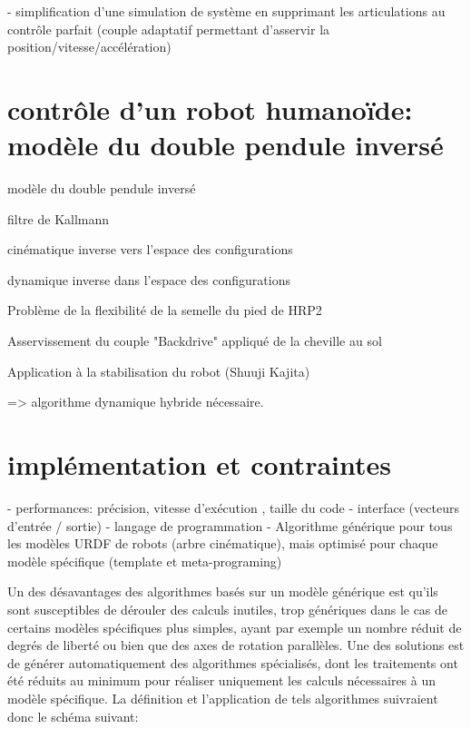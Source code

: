 \documentclass{report}
\begin{document}
	- simplification d'une simulation de système en supprimant les articulations au contrôle parfait (couple adaptatif permettant d'asservir la position/vitesse/accélération)


\section{contrôle d'un robot humanoïde: modèle du double pendule inversé}

modèle du double pendule inversé

filtre de Kallmann

cinématique inverse vers l'espace des configurations

dynamique inverse dans l'espace des configurations

Problème de la flexibilité de la semelle du pied de HRP2

Asservissement du couple "Backdrive" appliqué de la cheville au sol

Application à la stabilisation du robot (Shuuji Kajita)

=> algorithme dynamique hybride nécessaire.

\section{implémentation et contraintes} \label{ch_concepts_implEtContr}
- performances: précision, vitesse d'exécution , taille du code\vspace{0.3cm}
- interface (vecteurs d'entrée / sortie)\vspace{0.3cm}
- langage de programmation\vspace{0.3cm}
- Algorithme générique pour tous les modèles URDF de robots (arbre cinématique), mais optimisé pour chaque modèle spécifique (template et meta-programing)\vspace{0.3cm}

Un des désavantages des algorithmes basés sur un modèle générique est qu'ils sont susceptibles de dérouler des calculs inutiles, trop génériques dans le cas de certains modèles spécifiques plus simples, ayant par exemple un nombre réduit de degrés de liberté ou bien que des axes de rotation parallèles. Une des solutions est de générer automatiquement des algorithmes spécialisés, dont les traitements ont été réduits au minimum pour réaliser uniquement les calculs nécessaires à un modèle spécifique. La définition et l'application de tels algorithmes suivraient donc le schéma suivant:
\end{document}
